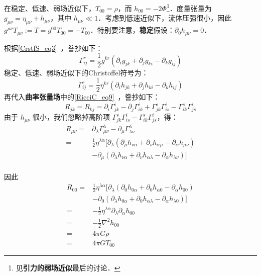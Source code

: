 在稳定、低速、弱场近似下，$T_{00}=\rho$，而 $h_{00}=-2\Phi$\footnote{见\textbf{引力的弱场近似}最后的讨论．}．度量张量为 $g_{\mu\nu}=\eta_{\mu\nu}+h_{\mu\nu}$，其中 $h_{\mu\nu}\ll 1$．考虑到低速近似下，流体压强很小，因此 $g^{\mu\nu}T_{\mu\nu}:=T=g^{00}T_{00}=-T_{00}$．特别要注意，\textbf{稳定}假设：$\partial_0h_{\mu\nu}=0$．



根据\autoref{CrstfS_eq3}~，誊抄如下：
\begin{equation}\label{EinEqn_eq8}
\Gamma^{r}_{ij}=\frac{1}{2}g^{kr}(\partial_ig_{jk}+\partial_jg_{ki}-\partial_kg_{ij})
\end{equation}
稳定、低速、弱场近似下的Christoffel符号为：
\begin{equation}
\Gamma^{r}_{ij}=\frac{1}{2}\eta^{kr}(\partial_ih_{jk}+\partial_jh_{ki}-\partial_kh_{ij})
\end{equation}
再代入\textbf{曲率张量场}中的\autoref{RicciC_eq9}~，誊抄如下：
\begin{equation}
R_{jk}=R_{kj}=\partial_i\Gamma^i_{jk}-\partial_j\Gamma^{i}_{ik}+\Gamma^s_{jk}\Gamma^i_{is}-\Gamma^s_{ik}\Gamma^i_{js}
\end{equation}
由于 $h_{\mu\nu}$ 很小，我们忽略掉高阶项 $\Gamma^s_{jk}\Gamma^i_{is}-\Gamma^s_{ik}\Gamma^i_{js}$，得：
\begin{equation}
\begin{aligned}
R_{\mu\nu}=&\partial_\lambda\Gamma^\lambda_{\mu\nu}-\partial_{\mu}\Gamma^\lambda_{\lambda\nu}\\
=&\frac{1}{2}\eta^{\lambda\alpha}[\partial_\lambda(\partial_\mu h_{\nu \alpha}+\partial_\nu h_{\alpha\mu}-\partial_\alpha h_{\mu\nu})\\
&-\partial_\mu(\partial_\lambda h_{\nu\alpha}+\partial_\nu h_{\alpha\lambda}-\partial_\alpha h_{\lambda\nu})]\\
\end{aligned}
\end{equation}

因此
\begin{equation}\label{EinEqn_eq5}
\begin{aligned}
R_{00}=&\frac{1}{2}\eta^{\lambda\alpha}[\partial_\lambda(\partial_0 h_{0 \alpha}+\partial_0 h_{\alpha0}-\partial_\alpha h_{00})\\
&-\partial_0(\partial_\lambda h_{0\alpha}+\partial_0 h_{\alpha\lambda}-\partial_\alpha h_{\lambda0})]\\
=&-\frac{1}{2}\eta^{\lambda\alpha}\partial_\lambda\partial_\alpha h_{00}\\
=&-\frac{1}{2}\nabla^2 h_{00}\\
=&4\pi G\rho\\
=&4\pi GT_{00}
\end{aligned}
\end{equation}

